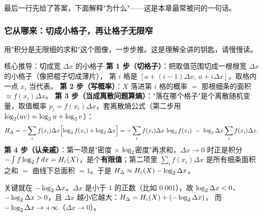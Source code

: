 最后一行先给了答案，下面解释"为什么"——这是本章最常被问的一句话。

\subsubsection{它从哪来：切成小格子，再让格子无限窄}

用"积分是无限细的求和"这个图像，一步步推。这是理解全讲的钥匙，请慢慢读。

\begin{calc}{核心推导：切成宽 $\Delta x$ 的小格子}
\textbf{第 1 步（切格子）}：把取值范围切成一根根宽 $\Delta x$ 的小格子（像把棍子切成薄片），
第 $i$ 格是 $[a+(i-1)\Delta x,\ a+i\Delta x]$，取格内一点 $x_i$ 当代表。
\textbf{第 2 步（写概率）}：$X$ 落进第 $i$ 格的概率 $=$ 那根细条的面积 $\approx f(x_i)\Delta x$。
\textbf{第 3 步（当成离散问题算熵）}："落在哪个格子"是个离散随机变量，取值概率
$p_i=f(x_i)\Delta x$，套离散熵公式（第二步用 $\log_{2}(uv)=\log_{2} u+\log_{2} v$）：
\begin{align*}
H_\Delta
=-\sum_{i}f(x_i)\Delta x\Bigl[\log_{2} f(x_i)+\log_{2}\Delta x\Bigr]
=-\sum_{i}f(x_i)\Delta x\,\log_{2} f(x_i)\ -\ \log_{2}\Delta x\sum_{i}f(x_i)\Delta x .
\end{align*}
\textbf{第 4 步（认亲戚）}：第一项是"密度 $\times$ $\log_{2}$密度"再求和，$\Delta x\to0$ 时正是积分
$-\int f\log_{2} f\,dx=H_{c}\!\left(X\right)$，是个\textbf{有限值}；第二项里 $\sum_if(x_i)\Delta x$ 是所有细条面积之和
$=$ 曲线下总面积 $=1$。于是 $H_\Delta\approx H_{c}\!\left(X\right)-\log_{2}\Delta x$。
\end{calc}

关键就在 $-\log_{2}\Delta x$。$\Delta x$ 是小于 $1$ 的正数（比如 $0.001$），故 $\log_{2}\Delta x<0$、
$-\log_{2}\Delta x>0$，且 $\Delta x$ 越小它越大：$H_\Delta=H_{c}\!\left(X\right)+(-\log_{2}\Delta x)$，
而 $-\log_{2}\Delta x\to+\infty$（$\Delta x\to0$）。

